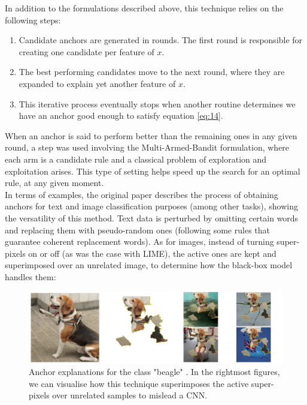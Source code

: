 In addition to the formulations described above, this technique relies on the following steps:

\begin{enumerate}
    \item Candidate anchors are generated in rounds. The first round is responsible for creating one candidate per feature of $x$.
    \item The best performing candidates move to the next round, where they are expanded to explain yet another feature of $x$.
    \item This iterative process eventually stops when another routine determines we have an anchor good enough to satisfy equation \ref{eq:14}.
\end{enumerate} 

When an anchor is said to perform better than the remaining ones in any given round, a step was used involving the  Multi-Armed-Bandit formulation, where each arm is a candidate rule and a classical problem of exploration and exploitation arises. This type of setting helps speed up the search for an optimal rule, at any given moment.\\

In terms of examples, the original paper describes the process of obtaining anchors for text and image classification purposes (among other tasks), showing the versatility of this method. Text data is perturbed by omitting certain words and replacing them with pseudo-random ones (following some rules that guarantee coherent replacement words). As for images, instead of turning super-pixels on or off (as was the case with \ac{LIME}), the active ones are kept and superimposed over an unrelated image, to determine how the black-box model handles them:

\begin{figure}[h]
\centering
\includegraphics[width=390pt]{figures/figure_24.pdf}
\caption{Anchor explanations for the class "beagle" \cite{anchors}. In the rightmost figures, we can visualise how this technique superimposes the active super-pixels over unrelated samples to mislead a \ac{CNN}.}
\label{fig:anchors_2}
\end{figure}

